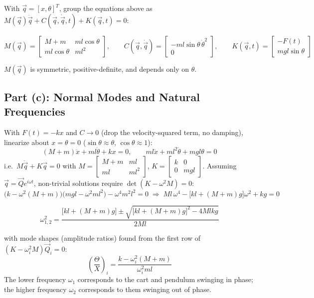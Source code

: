 \documentclass[11pt]{article}
\begin{document}
With $\vec q=[x,\theta]^T$, group the equations above as $M(\vec q)\ddot{\vec q}+C(\vec q,\dot{\vec q},t)+K(\vec q,t)=0$:
\begin{result}
\[
    M(\vec q) = \begin{bmatrix} M+m & ml\cos\theta \\ ml\cos\theta & ml^2 \end{bmatrix},
    \qquad
    C(\vec q,\dot{\vec q}) = \begin{bmatrix} -ml\sin\theta\,\dot\theta^2 \\ 0 \end{bmatrix},
    \qquad
    K(\vec q,t) = \begin{bmatrix} -F(t) \\ mgl\sin\theta \end{bmatrix}
\]
\end{result}
$M(\vec q)$ is symmetric, positive-definite, and depends only on $\theta$.

\subsection*{Part (c): Normal Modes and Natural Frequencies}

With $F(t)=-kx$ and $C\to 0$ (drop the velocity-squared term, no damping), linearize about $x=\theta=0$ ($\sin\theta\approx\theta$, $\cos\theta\approx1$):
\[
    (M+m)\ddot x + ml\ddot\theta + kx = 0,
    \qquad
    ml\ddot x + ml^2\ddot\theta + mgl\theta = 0
\]
i.e.\ $M\ddot{\vec q}+K\vec q=0$ with $M=\begin{bmatrix}M+m & ml\\ml & ml^2\end{bmatrix}$, $K=\begin{bmatrix}k&0\\0&mgl\end{bmatrix}$. Assuming $\vec q = \vec Q e^{i\omega t}$, non-trivial solutions require $\det(K-\omega^2 M)=0$:
\[
    \big(k-\omega^2(M+m)\big)\big(mgl-\omega^2 ml^2\big) - \omega^4 m^2l^2 = 0
    \;\Longrightarrow\;
    Ml\,\omega^4 - \big[kl+(M+m)g\big]\omega^2 + kg = 0
\]
\begin{result}
\[
    \omega_{1,2}^2 = \frac{\big[kl+(M+m)g\big] \pm \sqrt{\big[kl+(M+m)g\big]^2 - 4Mlkg}}{2Ml}
\]
\end{result}
with mode shapes (amplitude ratios) found from the first row of $(K-\omega_i^2M)\vec Q_i=0$:
\[
    \left(\frac{\Theta}{X}\right)_i = \frac{k-\omega_i^2(M+m)}{\omega_i^2 ml}
\]
The lower frequency $\omega_1$ corresponds to the cart and pendulum swinging in phase; the higher frequency $\omega_2$ corresponds to them swinging out of phase.
\end{document}
